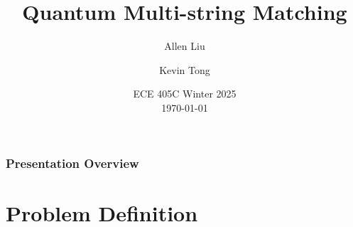 \documentclass[
	11pt, %
]{beamer}
\title[Quantum Multi-string Matching]{Quantum Multi-string Matching} %
\author[Allen Liu \and Kevin Tong]{Allen Liu \and Kevin Tong} %
\institute[UW]{University of Waterloo} %
\date[\today]{ECE 405C Winter 2025 \\ \today} %
\begin{document}
\newcommand*{\ket}[1]{\rvert#1\rangle}

\begin{frame}
    \titlepage %
\end{frame}



\begin{frame}
    \frametitle{Presentation Overview} %

    \tableofcontents %
\end{frame}


\section{Problem Definition} %
\end{document}
